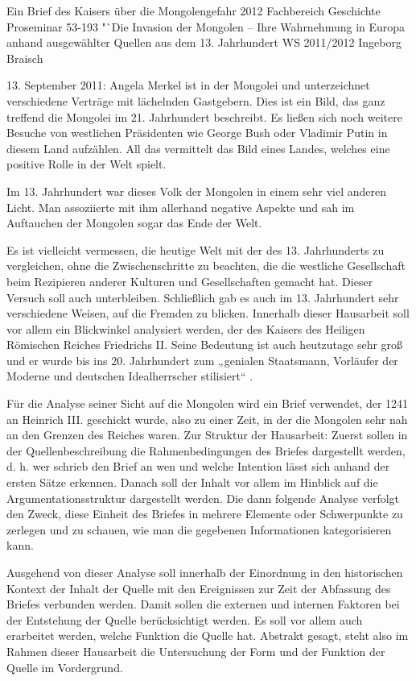 \documentclass{../../sem_paper}
\begin{document}
\titlepg
{Ein Brief des Kaisers über die Mongolengefahr}
{2012}
{Fachbereich Geschichte}
{Proseminar 53-193 "`Die Invasion der Mongolen -- Ihre Wahrnehmung in Europa anhand ausgewählter Quellen aus dem 13. Jahrhundert}
{WS 2011/2012}
{Ingeborg Braisch}

\tocpaper

13. September 2011: Angela Merkel ist in der Mongolei und unterzeichnet
verschiedene Verträge mit lächelnden Gastgebern. Dies ist ein Bild, das ganz treffend
die Mongolei im 21. Jahrhundert beschreibt. Es ließen sich noch weitere Besuche von
westlichen Präsidenten wie George Bush oder Vladimir Putin in diesem Land aufzählen.
All das vermittelt das Bild eines Landes, welches eine positive Rolle in der Welt spielt.

Im 13. Jahrhundert war dieses Volk der Mongolen in einem sehr viel anderen Licht.
Man assoziierte mit ihm allerhand negative Aspekte und sah im Auftauchen der
Mongolen sogar das Ende der Welt.

Es ist vielleicht vermessen, die heutige Welt mit der des 13. Jahrhunderts zu
vergleichen, ohne die Zwischenschritte zu beachten, die die westliche Gesellschaft beim
Rezipieren anderer Kulturen und Gesellschaften gemacht hat. Dieser Versuch soll auch
unterbleiben. Schließlich gab es auch im 13. Jahrhundert sehr verschiedene Weisen,
auf die Fremden zu blicken. Innerhalb dieser Hausarbeit soll vor allem ein Blickwinkel
analysiert werden, der des Kaisers des Heiligen Römischen Reiches Friedrichs II. Seine
Bedeutung ist auch heutzutage sehr groß und er wurde bis ins 20. Jahrhundert zum
„genialen Staatsmann, Vorläufer der Moderne und deutschen Idealherrscher stilisiert“ \autocite[Rückseite]{rader2010} .

Für die Analyse seiner Sicht auf die Mongolen wird ein Brief verwendet, der 1241 an
Heinrich III. geschickt wurde, also zu einer Zeit, in der die Mongolen sehr nah an den
Grenzen des Reiches waren. Zur Struktur der Hausarbeit: Zuerst sollen in der
Quellenbeschreibung die Rahmenbedingungen des Briefes dargestellt werden, d. h. wer
schrieb den Brief an wen und welche Intention lässt sich anhand der ersten Sätze
erkennen. Danach soll der Inhalt vor allem im Hinblick auf die Argumentationsstruktur
dargestellt werden.
Die dann folgende Analyse verfolgt den Zweck, diese Einheit des
Briefes in mehrere Elemente oder Schwerpunkte zu zerlegen und zu schauen, wie man
die gegebenen Informationen kategorisieren kann.

Ausgehend von dieser Analyse soll innerhalb der Einordnung in den historischen
Kontext der Inhalt der Quelle mit den Ereignissen zur Zeit der Abfassung des Briefes
verbunden werden. Damit sollen die externen und internen Faktoren bei der Entstehung
der Quelle berücksichtigt werden. Es soll vor allem auch erarbeitet werden, welche
Funktion die Quelle hat. Abstrakt gesagt, steht also im Rahmen dieser Hausarbeit die
Untersuchung der Form und der Funktion der Quelle im Vordergrund.
\end{document}
